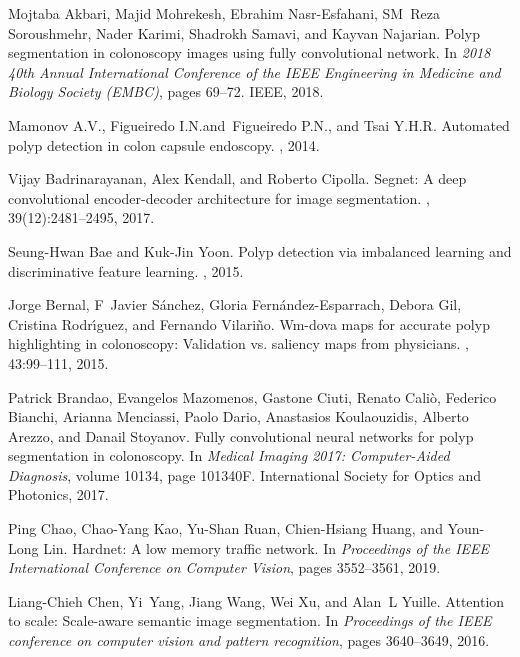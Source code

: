 \documentclass{article}
\begin{document}
\begin{thebibliography}{10}

Mojtaba Akbari, Majid Mohrekesh, Ebrahim Nasr-Esfahani, SM~Reza Soroushmehr,
  Nader Karimi, Shadrokh Samavi, and Kayvan Najarian.
\newblock Polyp segmentation in colonoscopy images using fully convolutional
  network.
\newblock In {\em 2018 40th Annual International Conference of the IEEE
  Engineering in Medicine and Biology Society (EMBC)}, pages 69--72. IEEE,
  2018.

Mamonov A.V., Figueiredo I.N.and~Figueiredo P.N., and Tsai Y.H.R.
\newblock Automated polyp detection in colon capsule endoscopy.
, 2014.

Vijay Badrinarayanan, Alex Kendall, and Roberto Cipolla.
\newblock Segnet: A deep convolutional encoder-decoder architecture for image
  segmentation.
,
  39(12):2481--2495, 2017.

Seung-Hwan Bae and Kuk-Jin Yoon.
\newblock Polyp detection via imbalanced learning and discriminative feature
  learning.
, 2015.

Jorge Bernal, F~Javier S{\'a}nchez, Gloria Fern{\'a}ndez-Esparrach, Debora Gil,
  Cristina Rodr{\'\i}guez, and Fernando Vilari{\~n}o.
\newblock Wm-dova maps for accurate polyp highlighting in colonoscopy:
  Validation vs. saliency maps from physicians.
, 43:99--111, 2015.

Patrick Brandao, Evangelos Mazomenos, Gastone Ciuti, Renato Cali{\`o}, Federico
  Bianchi, Arianna Menciassi, Paolo Dario, Anastasios Koulaouzidis, Alberto
  Arezzo, and Danail Stoyanov.
\newblock Fully convolutional neural networks for polyp segmentation in
  colonoscopy.
\newblock In {\em Medical Imaging 2017: Computer-Aided Diagnosis}, volume
  10134, page 101340F. International Society for Optics and Photonics, 2017.

Ping Chao, Chao-Yang Kao, Yu-Shan Ruan, Chien-Hsiang Huang, and Youn-Long Lin.
\newblock Hardnet: A low memory traffic network.
\newblock In {\em Proceedings of the IEEE International Conference on Computer
  Vision}, pages 3552--3561, 2019.

Liang-Chieh Chen, Yi~Yang, Jiang Wang, Wei Xu, and Alan~L Yuille.
\newblock Attention to scale: Scale-aware semantic image segmentation.
\newblock In {\em Proceedings of the IEEE conference on computer vision and
  pattern recognition}, pages 3640--3649, 2016.


\end{thebibliography}
\end{document}
